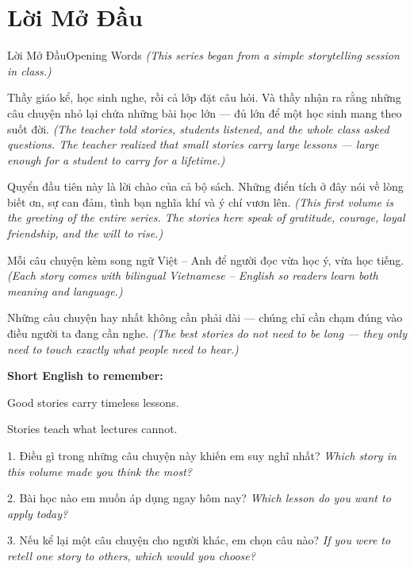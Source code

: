 \chapter*{Lời Mở Đầu}

\begin{truyen}{Lời Mở Đầu}{Opening Words}
\textit{(This series began from a simple storytelling session in class.)}

Thầy giáo kể, học sinh nghe, rồi cả lớp đặt câu hỏi. Và thầy nhận ra rằng những câu chuyện nhỏ lại chứa những bài học lớn — đủ lớn để một học sinh mang theo suốt đời.
\textit{(The teacher told stories, students listened, and the whole class asked questions. The teacher realized that small stories carry large lessons — large enough for a student to carry for a lifetime.)}

Quyển đầu tiên này là lời chào của cả bộ sách. Những điển tích ở đây nói về lòng biết ơn, sự can đảm, tình bạn nghĩa khí và ý chí vươn lên.
\textit{(This first volume is the greeting of the entire series. The stories here speak of gratitude, courage, loyal friendship, and the will to rise.)}

Mỗi câu chuyện kèm song ngữ Việt -- Anh để người đọc vừa học ý, vừa học tiếng.
\textit{(Each story comes with bilingual Vietnamese -- English so readers learn both meaning and language.)}
\end{truyen}

\begin{baihoc}
Những câu chuyện hay nhất không cần phải dài --- chúng chỉ cần chạm đúng vào điều người ta đang cần nghe.
\textit{(The best stories do not need to be long --- they only need to touch exactly what people need to hear.)}
\end{baihoc}

\begin{ghinhoanh}
\textbf{Short English to remember:}

Good stories carry timeless lessons.

Stories teach what lectures cannot.
\end{ghinhoanh}

\begin{tuhocnhanh}
1. Điều gì trong những câu chuyện này khiến em suy nghĩ nhất? \textit{Which story in this volume made you think the most?}

2. Bài học nào em muốn áp dụng ngay hôm nay? \textit{Which lesson do you want to apply today?}

3. Nếu kể lại một câu chuyện cho người khác, em chọn câu nào? \textit{If you were to retell one story to others, which would you choose?}
\end{tuhocnhanh}

\ngancach
